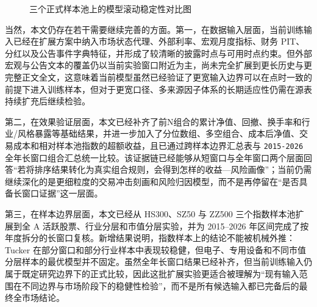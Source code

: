 \begin{figure}[htbp]
\centering
{}
\caption{三个正式样本池上的模型滚动稳定性对比图}
\label{fig:stability}
\end{figure}

当然，本文仍存在若干需要继续完善的方面。第一，在数据输入层面，当前训练输入已经在扩展方案中纳入市场状态代理、外部利率、宏观月度指标、财务 PIT、分红以及公告事件字典特征，并形成了较清晰的披露时点与可用时点约束。但外部宏观与公告文本的覆盖仍以当前实验窗口附近为主，尚未完全扩展到更长历史与更完整正文全文，这意味着当前模型虽然已经验证了更宽输入边界可以在点时一致的前提下进入训练样本，但对于更宽口径、多来源因子体系的长期适应性仍需在源表持续扩充后继续检验。

第二，在效果验证层面，本文已经补齐了前N组合的累计净值、回撤、换手率和行业/风格暴露等基础结果，并进一步加入了分位数组、多空组合、成本后净值、交易成本和相对样本池指数的超额收益，且已通过跨样本边界汇总表与 \texttt{2015-2026} 全年长窗口组合汇总统一比较。该证据链已经能够从短窗口与全年窗口两个层面回答“若将排序结果转化为真实组合规则，会得到怎样的收益—风险画像”；当前仍需继续深化的是更细粒度的交易冲击刻画和风险归因模型，而不是再停留在“是否具备长窗口证据”这一层面。

第三，在样本边界层面，本文已经从 HS300、SZ50 与 ZZ500 三个指数样本池扩展到全 A 活跃股票、行业分层和市值分层实验，并为 2015--2026 年区间完成了按年度拆分的长窗口复核。新增结果说明，指数样本上的结论不能被机械外推：Tucker 在部分窗口和部分行业样本中表现较稳健，但电子、专用设备和不同市值分层样本的最优模型并不固定。虽然全年长窗口结果已经补齐，但当前训练输入仍属于既定研究边界下的正式比较，因此这批扩展实验更适合被理解为“现有输入范围在不同边界与市场阶段下的稳健性检验”，而不是所有候选输入都已完备后的最终全市场结论。

